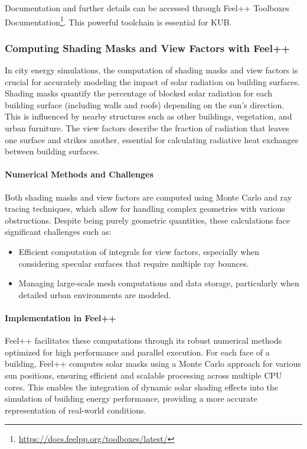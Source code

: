 \documentclass[runningheads]{llncs}
\begin{document}
Documentation and further details can be accessed through Feel++ Toolboxes Documentation\footnote{\url{https://docs.feelpp.org/toolboxes/latest/}}.
This powerful toolchain is essential for KUB.

\subsubsection{Computing Shading Masks and View Factors with Feel++}

In city energy simulations, the computation of shading masks and view factors is crucial for accurately modeling the impact of solar radiation on building surfaces. Shading masks quantify the percentage of blocked solar radiation for each building surface (including walls and roofs) depending on the sun's direction. This is influenced by nearby structures such as other buildings, vegetation, and urban furniture. The view factors describe the fraction of radiation that leaves one surface and strikes another, essential for calculating radiative heat exchanges between building surfaces.

\paragraph{Numerical Methods and Challenges}
Both shading masks and view factors are computed using Monte Carlo and ray tracing techniques, which allow for handling complex geometries with various obstructions. Despite being purely geometric quantities, these calculations face significant challenges such as:
\begin{itemize}
    \item Efficient computation of integrals for view factors, especially when considering specular surfaces that require multiple ray bounces.
    \item Managing large-scale mesh computations and data storage, particularly when detailed urban environments are modeled.
\end{itemize}

\paragraph{Implementation in Feel++}
Feel++ facilitates these computations through its robust numerical methods optimized for high performance and parallel execution. For each face of a building, Feel++ computes solar masks using a Monte Carlo approach for various sun positions, ensuring efficient and scalable processing across multiple CPU cores. This enables the integration of dynamic solar shading effects into the simulation of building energy performance, providing a more accurate representation of real-world conditions.
\end{document}
